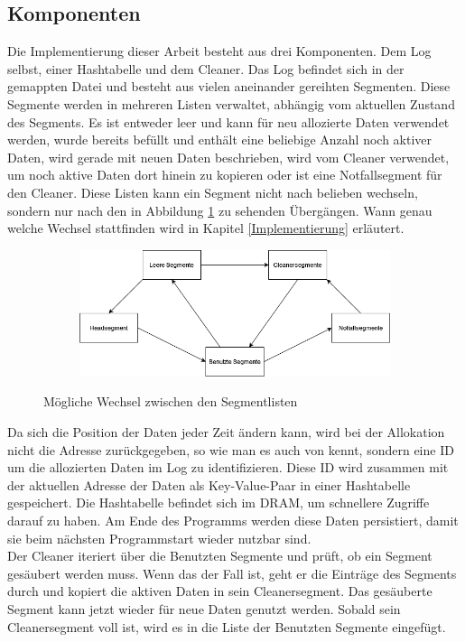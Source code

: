 \documentclass{class/thesis}
\begin{document}
\begin{thesis}
	
	
	\section{Komponenten}
	Die Implementierung dieser Arbeit besteht aus drei Komponenten. Dem Log selbst, einer Hashtabelle und dem Cleaner. Das Log befindet sich in der gemappten Datei und besteht aus vielen aneinander gereihten Segmenten.
	Diese Segmente werden in mehreren Listen verwaltet, abhängig vom aktuellen Zustand des Segments. Es ist entweder leer und kann für neu allozierte Daten verwendet werden, wurde bereits befüllt und enthält eine beliebige Anzahl noch aktiver Daten, wird gerade mit neuen Daten beschrieben, wird vom Cleaner verwendet, um noch aktive Daten dort hinein zu kopieren oder ist eine Notfallsegment für den Cleaner. Diese Listen kann ein Segment nicht nach belieben wechseln, sondern nur nach den in Abbildung \ref{segmenteListenWechsel} zu sehenden Übergängen. Wann genau welche Wechsel stattfinden wird in Kapitel \ref{Implementierung} erläutert.
	
	\begin{figure}[h]
		\centering
		\begin{subfigure}[b]{1.0\textwidth}
			\includegraphics[width=1.0\linewidth]{img/SegmenteListenWechsel.drawio.png}
		\end{subfigure}
		\caption{Mögliche Wechsel  zwischen den Segmentlisten}
		\label{segmenteListenWechsel}
	\end{figure}
	
	Da sich die Position der Daten jeder Zeit ändern kann, wird bei der Allokation nicht die Adresse zurückgegeben, so wie man es auch von  kennt, sondern eine ID um die allozierten Daten im Log zu identifizieren.
	Diese ID wird zusammen mit der aktuellen Adresse der Daten als Key-Value-Paar in einer Hashtabelle gespeichert. Die Hashtabelle befindet sich im DRAM, um schnellere Zugriffe darauf zu haben. Am Ende des Programms werden diese Daten persistiert, damit sie beim nächsten Programmstart wieder nutzbar sind. \\
	Der Cleaner iteriert über die Benutzten Segmente und prüft, ob ein Segment gesäubert werden muss. Wenn das der Fall ist, geht er die Einträge des Segments durch und kopiert die aktiven Daten in sein Cleanersegment. Das gesäuberte Segment kann jetzt wieder für neue Daten genutzt werden. Sobald sein Cleanersegment voll ist, wird es in die Liste der Benutzten Segmente eingefügt.
	


\end{thesis}
\end{document}
